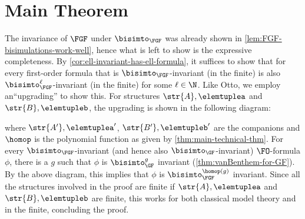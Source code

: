 \ifmainpart
\vanbenthemFGF*
\else
  \section{Main Theorem}
  \vanbenthemFGF
\fi
\ifmainpart
\newsavebox{\diagupgrading}
\begin{lrbox}{\diagupgrading}{
}
\end{lrbox}
\begin{proofsketch}
  The invariance of $\FGF$ under $\bisimto_{\FGF}$ was already shown in \cref{lem:FGF-bisimulations-work-well}, hence what is left to show is the expressive completeness.
  By \cref{cor:ell-invariant-has-ell-formula}, it suffices to show that for every first-order formula that is $\bisimto_{\FGF}$-invariant (in the finite) is also $\bisimto_{\FGF}^{\ell}$-invariant (in the finite) for some $\ell \in \N$.
  Like Otto, we employ an``upgrading'' to show this.
  For structures $\str{A}, \elemtuplea$ and $\str{B}, \elemtupleb$, the upgrading is shown in the following diagram:
  \begin{center}%
    \usebox{\diagupgrading}
  \end{center}
  where $\str{A'}, \elemtuplea'$, $\str{B'}, \elemtupleb'$ are the companions and $\homop$ is the polynomial function as given by \cref{thm:main-technical-thm}.
  For every $\bisimto_{\FGF}$-invariant (and hence also $\bisimto_{\GF}$-invariant) $\FO$-formula $\phi$, there is a $g$ such that $\phi$ is $\bisimto_{\GF}^{g}$ invariant (\cref{thm:vanBenthem-for-GF}).
  By the above diagram, this implies that $\phi$ is $\bisimto_{\FGF}^{\homop(g)}$ invariant.
  Since all the structures involved in the proof are finite if $\str{A}, \elemtuplea$ and $\str{B},  \elemtupleb$ are finite, this works for both classical model theory and in the finite, concluding the proof.
\end{proofsketch}
